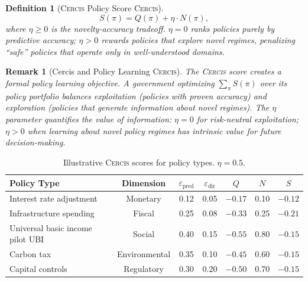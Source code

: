 \documentclass[11pt,a4paper]{article}
\newtheorem{definition}[theorem]{Definition}
\newtheorem{remark}[theorem]{Remark}
\theoremstyle{definition}
\newcommand{\Cercis}{\textsc{Cercis}}
\begin{document}
\begin{definition}[\Cercis{} Policy Score \Cercis{}]
\label{def:cercis_policy}
\begin{equation}
    S(\pi) = Q(\pi) + \eta \cdot N(\pi),
    \label{eq:cercis_policy}
\end{equation}
where $\eta \geq 0$ is the novelty-accuracy tradeoff. $\eta = 0$ ranks policies purely by predictive accuracy; $\eta > 0$ rewards policies that explore novel regimes, penalizing ``safe'' policies that operate only in well-understood domains.
\end{definition}
\begin{remark}[Cercis{} and Policy Learning \Cercis{}]
\label{rem:cercis_learning}
The \Cercis{} score creates a formal policy learning objective. A government optimizing $\sum_\pi S(\pi)$ over its policy portfolio balances exploitation (policies with proven accuracy) and exploration (policies that generate information about novel regimes). The $\eta$ parameter quantifies the value of information: $\eta = 0$ for risk-neutral exploitation; $\eta > 0$ when learning about novel policy regimes has intrinsic value for future decision-making.
\end{remark}
\begin{table}[htbp]
\centering
\caption{Illustrative \Cercis{} scores for policy types. $\eta = 0.5$.}
\label{tab:cercis_policy}
\begin{tabular}{lcccccc}
\toprule
Policy Type  & Dimension  & $\varepsilon_{\mathrm{pred}}$ & $\varepsilon_{\mathrm{dir}}$ & $Q$ & $N$ & $S$ \\
\midrule
Interest rate adjustment  & Monetary & 0.12 & 0.05 & $-0.17$ & 0.10 & $-0.12$ \\
Infrastructure spending  & Fiscal & 0.25 & 0.08 & $-0.33$ & 0.25 & $-0.21$ \\
Universal basic income pilot UBI & Social & 0.40 & 0.15 & $-0.55$ & 0.80 & $-0.15$ \\
Carbon tax  & Environmental & 0.35 & 0.10 & $-0.45$ & 0.60 & $-0.15$ \\
Capital controls  & Regulatory & 0.30 & 0.20 & $-0.50$ & 0.70 & $-0.15$ \\
\bottomrule
\end{tabular}
\end{table}
\end{document}
